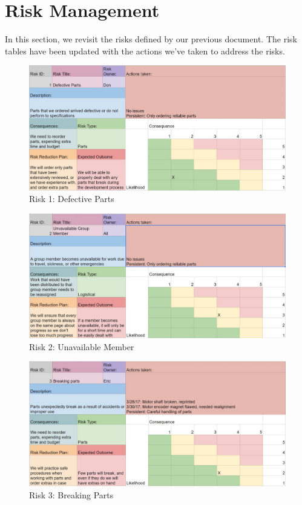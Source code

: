 
\section{Risk Management}
\label{sec:risk_management}


In this section, we revisit the risks defined by our previous document. The risk tables have been updated with the actions we've taken to address the risks.\

\begin{figure}[h!]
\centering
\includegraphics[width=0.98\columnwidth]{risks/risk1.JPG}
\caption{Risk 1: Defective Parts}
\label{fig:risk1}
\end{figure}

\begin{figure}[h!]
\centering
\includegraphics[width=0.98\columnwidth]{risks/risk2.JPG}
\caption{Risk 2: Unavailable Member}
\label{fig:risk2}
\end{figure}

\begin{figure}[h!]
\centering
\includegraphics[width=0.98\columnwidth]{risks/risk3.JPG}
\caption{Risk 3: Breaking Parts}
\label{fig:risk3}
\end{figure}

